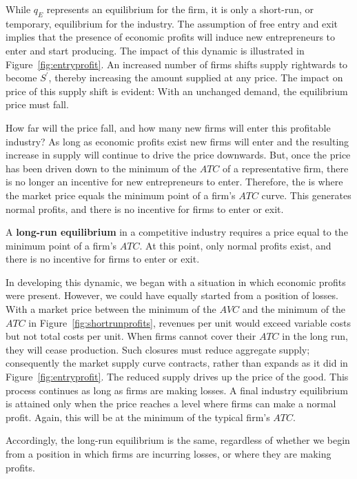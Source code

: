 

\newhtmlpage



While $q_{E}$ represents an equilibrium for the firm, it is only a
short-run, or temporary, equilibrium for the industry. The assumption of
free entry and exit implies that the presence of economic profits will
induce new entrepreneurs to enter and start producing. The impact of this
dynamic is illustrated in Figure~\ref{fig:entryprofit}. An increased number
of firms shifts supply rightwards to become $S^{\prime}$, thereby
increasing the amount supplied at any price. The impact on price of this
supply shift is evident: With an unchanged demand, the equilibrium price
must fall.

\newhtmlpage

How far will the price fall, and how many new firms will enter this
profitable industry? As long as economic profits exist new firms will enter
and the resulting increase in supply will continue to drive the price
downwards. But, once the price has been driven down to the minimum of the 
$ATC$ of a representative firm, there is no longer an incentive for new
entrepreneurs to enter. Therefore, the  
is where the market price equals the minimum point of a firm's 
$ATC$ curve. This generates normal profits, and there is no incentive for
firms to enter or exit.

\begin{DefBox}
	A \textbf{long-run equilibrium} in a competitive industry requires a price equal to the minimum point of a firm's $ATC$. At this point, only normal profits exist, and there is no incentive for firms to enter or exit.
\end{DefBox}

In developing this dynamic, we began with a situation in which economic
profits were present. However, we could have equally started from a position
of losses. With a market price between the minimum of the $AVC$ and the
minimum of the $ATC$ in Figure~\ref{fig:shortrunprofits}, revenues per unit
would exceed variable costs but not total costs per unit. When firms cannot
cover their $ATC$ in the long run, they will cease production. Such closures
must reduce aggregate supply; consequently the market supply curve
contracts, rather than expands as it did in Figure~\ref{fig:entryprofit}.
The reduced supply drives up the price of the good. This process continues
as long as firms are making losses. A final industry equilibrium is attained
only when the price reaches a level where firms can make a normal profit.
Again, this will be at the minimum of the typical firm's $ATC$.

Accordingly, the long-run equilibrium is the same, regardless of whether we
begin from a position in which firms are incurring losses, or where they are
making profits.